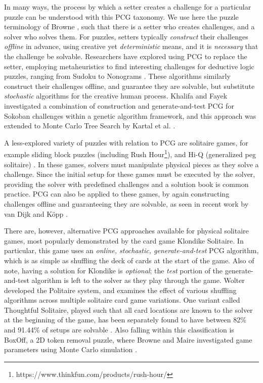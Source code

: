 \documentclass[10pt,journal,compsoc]{IEEEtran}
\begin{document}
In many ways, the process by which a setter creates a challenge for a particular puzzle can be understood with this PCG taxonomy. We use here the puzzle terminology of Browne \cite{PUZZLENATURE}, such that there is a setter who creates challenges, and a solver who solves them.
For puzzles, setters typically {\it construct} their challenges {\it offline} in advance, using creative yet {\it deterministic} means, and it is {\it necessary} that the challenge be solvable. Researchers have explored using PCG to replace the setter, employing metaheuristics to find interesting challenges for deductive logic puzzles, ranging from Sudoku \cite{SUDOKU} to Nonograms \cite{NONOGRAM}. These algorithms similarly construct their challenges offline, and guarantee they are solvable, but substitute {\it stochastic} algorithms for the creative human process.
Khalifa and Fayek\cite{PUZZLELANG} investigated a combination of construction and generate-and-test PCG for Sokoban challenges within a genetic algorithm framework, and this approach was extended to Monte Carlo Tree Search by Kartal et al. \cite{SOKOBAN}.

A less-explored variety of puzzles with relation to PCG 
are solitaire games, for example
sliding block puzzles \cite{FIFTEEN} (including Rush Hour\footnote{https://www.thinkfun.com/products/rush-hour/}), 
and Hi-Q (generalized peg solitaire) \cite{PEG}. In these games, solvers must manipulate physical pieces as they solve a challenge. Since the initial setup for these games must be executed by the solver, providing the solver with predefined challenges and a solution book is common practice. PCG can also be applied to these games, by again constructing challenges offline and guaranteeing they are solvable, as seen in recent work by van Dijk \cite{RUSHHOUR} and K{\"o}pp \cite{TANGRAM}. 

There are, however, alternative PCG approaches available for physical solitaire games, most popularly demonstrated by the card game Klondike Solitaire. In particular, this game uses an {\it online, stochastic, generate-and-test} PCG algorithm, which is as simple as shuffling the deck of cards at the start of the game. Also of note, having a solution for Klondike is {\it optional}; the {\it test} portion of the generate-and-test algorithm is left to the solver as they play through the game. Wolter \cite{SOLITAIREVARIANTS} developed the Politaire system, and examines the effect of various shuffling algorithms across multiple solitaire card game variations. One variant called Thoughtful Solitaire, played such that all card locations are known to the solver at the beginning of the game, has been separately found to have between 82\% and 91.44\% of setups are solvable \cite{THOUGHTFUL}. Also falling within this classification is BoxOff, a 2D token removal puzzle, where Browne and Maire investigated game parameters using Monte Carlo simulation \cite{MCPUZZLE}.
\noindent
\end{document}
